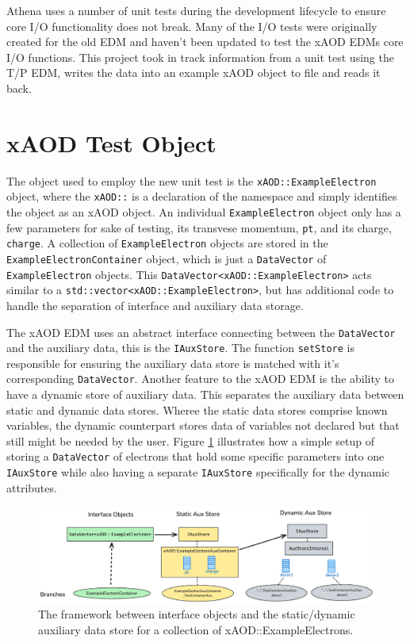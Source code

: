 Athena uses a number of unit tests during the development lifecycle to ensure core I/O functionality does not break.
Many of the I/O tests were originally created for the old EDM and haven't been updated to test the xAOD EDMs core I/O functions.
This project took in track information from a unit test using the T/P EDM, writes the data into an example xAOD object to file and reads it back.


\section{xAOD Test Object}
\label{sec:Mod_utests_xAOD_object}

The object used to employ the new unit test is the \verb|xAOD::ExampleElectron| object, where the \verb|xAOD::| is a declaration of the namespace and simply identifies the object as an xAOD object.
An individual \verb|ExampleElectron| object only has a few parameters for sake of testing, its transvese momentum, \verb|pt|, and its charge, \verb|charge|.
A collection of \verb|ExampleElectron| objects are stored in the \verb|ExampleElectronContainer| object, which is just a \verb|DataVector| of \verb|ExampleElectron| objects.\cite{Buckley_2015}
This \verb|DataVector<xAOD::ExampleElectron>| acts similar to a \verb|std::vector<xAOD::ExampleElectron>|, but has additional code to handle the separation of interface and auxiliary data storage. 

The xAOD EDM uses an abstract interface connecting between the \verb|DataVector| and the auxiliary data, this is the \verb|IAuxStore|. 
The function \verb|setStore| is responsible for ensuring the auxiliary data store is matched with it's corresponding \verb|DataVector|.
Another feature to the xAOD EDM is the ability to have a dynamic store of auxiliary data.
This separates the auxiliary data between static and dynamic data stores. 
Wheree the static data stores comprise known variables, the dynamic counterpart stores data of variables not declared but that still might be needed by the user. 
Figure \ref{fig:Mod_utests_aux_store} illustrates how a simple setup of storing a \verb|DataVector| of electrons that hold some specific parameters into one \verb|IAuxStore| while also having a separate \verb|IAuxStore| specifically for the dynamic attributes. 

\begin{figure}[h]
    \centering
    \includegraphics[width=\textwidth]{content/img/aux_store_better.png}
    \caption{The framework between interface objects and the static/dynamic auxiliary data store for a collection of xAOD::ExampleElectrons.}
    \label{fig:Mod_utests_aux_store}
\end{figure}





